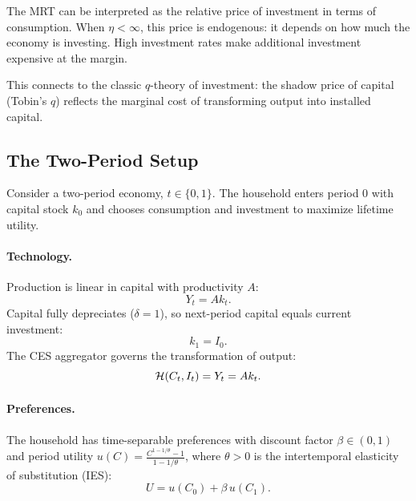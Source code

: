 \begin{calloutnote}
The MRT can be interpreted as the relative price of investment in terms of consumption. When $\eta < \infty$, this price is endogenous: it depends on how much the economy is investing. High investment rates make additional investment expensive at the margin.

This connects to the classic $q$-theory of investment: the shadow price of capital (Tobin's $q$) reflects the marginal cost of transforming output into installed capital.
\end{calloutnote}

\subsection{The Two-Period Setup}
\label{subsec:ac-two-period-setup}

Consider a two-period economy, $t \in \{0, 1\}$. The household enters period 0 with capital stock $k_0$ and chooses consumption and investment to maximize lifetime utility.

\paragraph{Technology.}
Production is linear in capital with productivity $A$:
\begin{equation}
Y_t = A k_t.
\label{eq:ac-production}
\end{equation}
Capital fully depreciates ($\delta = 1$), so next-period capital equals current investment:
\begin{equation}
k_1 = I_0.
\label{eq:ac-capital-accum}
\end{equation}
The CES aggregator governs the transformation of output:
\begin{equation}
\mathcal{H}(C_t, I_t) = Y_t = A k_t.
\label{eq:ac-resource}
\end{equation}

\paragraph{Preferences.}
The household has time-separable preferences with discount factor $\beta \in (0,1)$ and period utility $u(C) = \frac{C^{1-1/\theta} - 1}{1 - 1/\theta}$, where $\theta > 0$ is the intertemporal elasticity of substitution (IES):
\begin{equation}
U = u(C_0) + \beta \, u(C_1).
\label{eq:ac-utility}
\end{equation}

